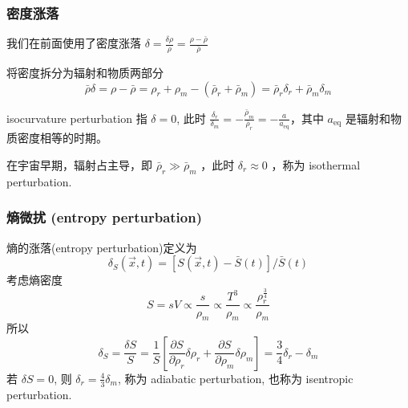 \documentclass[12pt]{ctexart}
\newcommand{\new}[1]{\textcolor{blue}{#1}}
\begin{document}
\subsubsection{密度涨落}
我们在前面使用了密度涨落 
$\delta = \frac{\delta \rho}{\rho} = \frac{\rho -\bar{\rho}}{\bar{\rho}}$

将密度拆分为辐射和物质两部分
\begin{equation}
    \bar{\rho}\delta = \rho-\bar{\rho} = \rho_r + \rho_m - \left(\bar{\rho}_r + \bar{\rho}_m\right) = \bar{\rho}_r \delta_r + \bar{\rho}_m \delta_m
\end{equation}

isocurvature perturbation 指 $\delta = 0$, 此时 $\frac{\delta_r}{\delta_m} = -\frac{\bar{\rho}_m}{\bar{\rho}_r} = -\frac{a}{a_\text{eq}}$，其中 $a_\text{eq}$ 是辐射和物质密度相等的时期。


在宇宙早期，辐射占主导，即 $\bar{\rho}_r \gg \bar{\rho}_m$ ，此时 
$\delta_r \approx  0$ ，称为 isothermal perturbation.


\subsubsection{熵微扰 (entropy perturbation)}

熵的涨落(entropy perturbation)定义为
\begin{equation}
    \delta_S\left(\vec{x},t\right) = \left[S\left(\vec{x},t\right)-\bar{S}(t)\right]/\bar{S}(t)
\end{equation}
考虑熵密度
\begin{equation}
    S = sV \propto \frac{s}{\rho_m} \propto \frac{T^3}{\rho_m}  \propto \frac{\rho_r^{\frac{3}{4}}}{\rho_m}
\end{equation}
所以 %
\begin{equation}
    \delta_S = \frac{\delta S}{S} = \frac{1}{S} \left[\frac{\partial S}{\partial \rho_r}\delta \rho_r + \frac{\partial S}{\partial \rho_m}\delta \rho_m\right] = \frac{3}{4}\delta_r -\delta_m
\end{equation}
若 $\delta S=0$, 则 $\delta_r = \frac{4}{3} \delta_m$, 称为 adiabatic perturbation, 也称为 isentropic perturbation.
\end{document}
